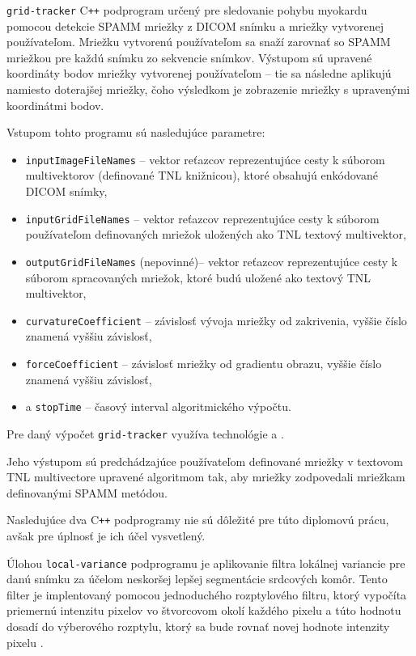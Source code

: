 \texttt{grid-tracker} C\texttt{++} podprogram určený pre sledovanie pohybu myokardu pomocou detekcie SPAMM mriežky z DICOM snímku a mriežky vytvorenej používateľom. Mriežku vytvorenú používateľom sa snaží zarovnať so SPAMM mriežkou pre každú snímku zo sekvencie snímkov. Výstupom sú upravené koordináty bodov mriežky vytvorenej používateľom -- tie sa následne aplikujú namiesto doterajšej mriežky, čoho výsledkom je zobrazenie mriežky s upravenými koordinátmi bodov. \newline

Vstupom tohto programu sú nasledujúce parametre:
\begin {itemize}
\item {\texttt{inputImageFileNames} -- vektor reťazcov reprezentujúce cesty k súborom multivektorov (definované TNL knižnicou), ktoré obsahujú enkódované DICOM snímky,}
\item {\texttt{inputGridFileNames} -- vektor reťazcov reprezentujúce cesty k súborom používateľom definovaných mriežok uložených ako TNL textový multivektor,}
\item {\texttt{outputGridFileNames} (nepovinné)-- vektor reťazcov reprezentujúce cesty k súborom spracovaných mriežok, ktoré budú uložené ako textový TNL multivektor,}
\item {\texttt{curvatureCoefficient} -- závislosť vývoja mriežky od zakrivenia, vyššie číslo znamená vyššiu závislosť,}
\item {\texttt{forceCoefficient} -- závislosť mriežky od gradientu obrazu, vyššie číslo znamená vyššiu závislosť,}
\item {a \texttt{stopTime} -- časový interval algoritmického výpočtu.}
\end {itemize}

Pre daný výpočet \texttt{grid-tracker} využíva technológie  a .

Jeho výstupom sú predchádzajúce používateľom definované mriežky v textovom TNL multivectore upravené algoritmom tak, aby mriežky zodpovedali mriežkam definovanými SPAMM metódou. \newline

Nasledujúce dva C\texttt{++} podprogramy nie sú dôležité pre túto diplomovú prácu, avšak pre úplnosť je ich účel vysvetlený. \newline

Úlohou \texttt{local-variance} podprogramu je aplikovanie filtra lokálnej variancie pre danú snímku za účelom neskoršej lepšej segmentácie srdcových komôr. Tento filter je implentovaný pomocou jednoduchého rozptylového filtru, ktorý vypočíta priemernú intenzitu pixelov vo štvorcovom okolí každého pixelu a túto hodnotu dosadí do výberového rozptylu, ktorý sa bude rovnať novej hodnote intenzity pixelu \cite{master_thesis_app}.

